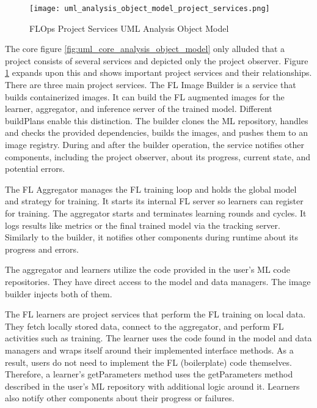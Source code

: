 \begin{figure}[h]
    \begin{adjustwidth}{-0.1\paperwidth}{-0.1\paperwidth}
        \centering
        \texttt{[image: uml\_analysis\_object\_model\_project\_services.png]}
        \caption{FLOps Project Services UML Analysis Object Model}
        \label{fig:uml_project_services_analysis_object_model}
    \end{adjustwidth}
\end{figure}

The core figure \ref{fig:uml_core_analysis_object_model} only alluded that a project consists of several services and depicted only the project observer.
Figure \ref{fig:uml_project_services_analysis_object_model} expands upon this and shows important project services and their relationships.
There are three main project services.
The FL Image Builder is a service that builds containerized images.
It can build the FL augmented images for the learner, aggregator, and inference server of the trained model.
Different buildPlans enable this distinction.
The builder clones the ML repository, handles and checks the provided dependencies, builds the images, and pushes them to an image registry.
During and after the builder operation, the service notifies other components, including the project observer, about its progress, current state, and potential errors.

The FL Aggregator manages the FL training loop and holds the global model and strategy for training.
It starts its internal FL server so learners can register for training.
The aggregator starts and terminates learning rounds and cycles.
It logs results like metrics or the final trained model via the tracking server.
Similarly to the builder, it notifies other components during runtime about its progress and errors.

The aggregator and learners utilize the code provided in the user's ML code repositories.
They have direct access to the model and data managers.
The image builder injects both of them.

The FL learners are project services that perform the FL training on local data.
They fetch locally stored data, connect to the aggregator, and perform FL activities such as training.
The learner uses the code found in the model and data managers and wraps itself around their implemented interface methods.
As a result, users do not need to implement the FL (boilerplate) code themselves.
Therefore, a learner's getParameters method uses the getParameters method described in the user's ML repository with additional logic around it.
Learners also notify other components about their progress or failures.

